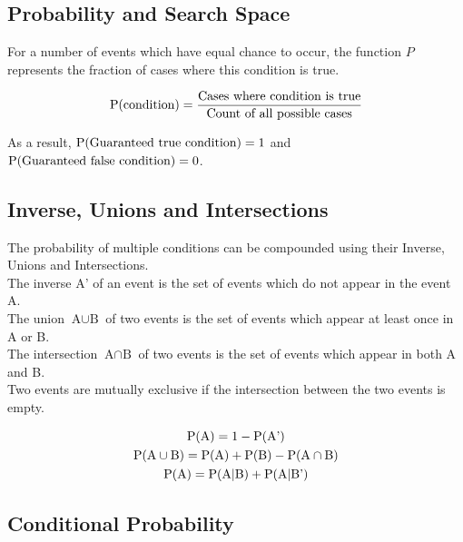 \documentclass[../main]{subfiles}
\begin{document}
	\subsection{Probability and Search Space}

	For a number of events which have equal chance to occur, the function \(P\) represents the fraction of cases where this condition is true.

	\[ \operatorname{P}(\text{condition}) = \frac{\text{Cases where condition is true}}{\text{Count of all possible cases}}\]

	As a result, \(\operatorname{P}(\text{Guaranteed true condition}) = 1 \) and \(\operatorname{P}(\text{Guaranteed false condition}) = 0 \). \\

	\subsection{Inverse, Unions and Intersections}

	The probability of multiple conditions can be compounded using their Inverse, Unions and Intersections. \\

	The inverse \(\text{A'}\) of an event is the set of events which do not appear in the event A. \\

	The union \(\text{A}\cup\text{B}\) of two events is the set of events which appear at least once in A or B. \\

	The intersection \(\text{A}\cap\text{B}\) of two events is the set of events which appear in both A and B. \\

	Two events are mutually exclusive if the intersection between the two events is empty.

	\begin{equation*} \begin{gathered}
		\operatorname{P}(\text{A}) = 1 - \operatorname{P}(\text{A'}) \\
		\operatorname{P}(\text{A}\cup\text{B}) = \operatorname{P}(\text{A}) + \operatorname{P}(\text{B}) - \operatorname{P}(\text{A}\cap\text{B}) \\
		\operatorname{P}(\text{A}) = \operatorname{P}(\text{A}|\text{B}) + \operatorname{P}(\text{A}|\text{B'}) \\
	\end{gathered} \end{equation*}

	\subsection{Conditional Probability}
\end{document}

